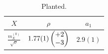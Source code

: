 \begin{table}
\begin{tabular}{||c||c|c||}
\hline \hline $X$ & $\rho$ & $a_1$ \\
\hline $\frac{m_X^{(0)}}{\sqrt{\sigma}}$ & $1.77(1)\begin{pmatrix}+2 \cr -3\end{pmatrix}$ & $2.9(1)$ \\
\end{tabular}
\caption{Planted.}\label{t:finaltable}
\end{table}

